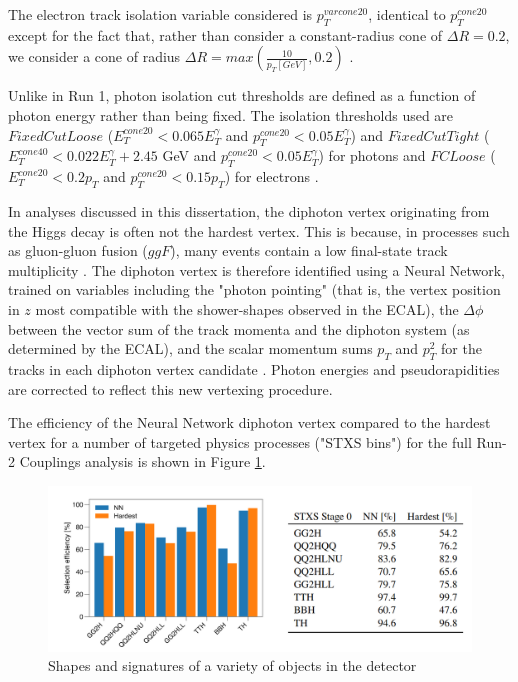 The electron track isolation variable considered is $p_{T}^{varcone20}$, identical to $p_{T}^{cone20}$ except for the fact that, rather than consider a constant-radius cone of $\Delta R = 0.2$, we consider a cone of radius $\Delta R = max(\frac{10}{p_{T}[GeV]}, 0.2)$ \cite{CERN-EP-2019-145}.

Unlike in Run 1, photon isolation cut thresholds are defined as a function of photon energy rather than being fixed. The isolation thresholds used are $FixedCutLoose$ ($E_{T}^{cone20}< 0.065 E_{T}^{\gamma}$ and $p_{T}^{cone20} < 0.05 E_{T}^{\gamma}$) and $FixedCutTight$ ($E_{T}^{cone40}< 0.022 E_{T}^{\gamma} + 2.45$ GeV and $p_{T}^{cone20} < 0.05 E_{T}^{\gamma}$) for photons and $FCLoose$ ($E_{T}^{cone20}< 0.2 p_{T}$ and $p_{T}^{cone20} < 0.15 p_{T}$) for electrons \cite{ATL-COM-PHYS-2020-378}.

In analyses discussed in this dissertation, the diphoton vertex originating from the Higgs decay is often not the hardest vertex. This is because, in processes such as gluon-gluon fusion ($ggF$), many events contain a low final-state track multiplicity \cite{1408.7084}. The diphoton vertex is therefore identified using a Neural Network, trained on variables including the "photon pointing" (that is, the vertex position in $z$ most compatible with the shower-shapes observed in the ECAL), the $\Delta \phi$ between the vector sum of the track momenta and the diphoton system (as determined by the ECAL), and the scalar momentum sums $p_{T}$ and $p_{T}^2$ for the tracks in each diphoton vertex candidate \cite{ATL-COM-PHYS-2020-378}. Photon energies and pseudorapidities are corrected to reflect this new vertexing procedure.

The efficiency of the Neural Network diphoton vertex compared to the hardest vertex for a number of targeted physics processes ("STXS bins") for the full Run-2 Couplings analysis is shown in Figure \ref{fig:Vertexing}.

\begin{figure}
  \includegraphics[width=\linewidth]{figures/methods_chapter/Vertexing.png}
  \caption{Shapes and signatures of a variety of objects in the detector \cite{ATL-COM-PHYS-2020-378}}
  \label{fig:Vertexing}
\end{figure}

